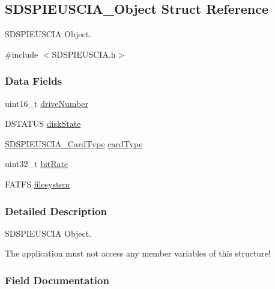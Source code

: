 \subsection{S\+D\+S\+P\+I\+E\+U\+S\+C\+I\+A\+\_\+\+Object Struct Reference}
\label{struct_s_d_s_p_i_e_u_s_c_i_a___object}


S\+D\+S\+P\+I\+E\+U\+S\+C\+I\+A Object.  




{\ttfamily \#include $<$S\+D\+S\+P\+I\+E\+U\+S\+C\+I\+A.\+h$>$}

\subsubsection*{Data Fields}
\begin{DoxyCompactItemize}
\item 
uint16\+\_\+t \hyperlink{struct_s_d_s_p_i_e_u_s_c_i_a___object_a5d6a52c5b2b7a1dda7fe2279f19c5e6b}{drive\+Number}
\item 
D\+S\+T\+A\+T\+U\+S \hyperlink{struct_s_d_s_p_i_e_u_s_c_i_a___object_adcb732d472748393dbf3a52e24b4d428}{disk\+State}
\item 
\hyperlink{_s_d_s_p_i_e_u_s_c_i_a_8h_aaf384a8a07d5fb92b9ba72250174d577}{S\+D\+S\+P\+I\+E\+U\+S\+C\+I\+A\+\_\+\+Card\+Type} \hyperlink{struct_s_d_s_p_i_e_u_s_c_i_a___object_a50815c1e112047b907a4f9d84b872727}{card\+Type}
\item 
uint32\+\_\+t \hyperlink{struct_s_d_s_p_i_e_u_s_c_i_a___object_a83aec3fd0962a754e277c9fc21f97549}{bit\+Rate}
\item 
F\+A\+T\+F\+S \hyperlink{struct_s_d_s_p_i_e_u_s_c_i_a___object_a3e10853e7c79a7b99d481353cbd71739}{filesystem}
\end{DoxyCompactItemize}


\subsubsection{Detailed Description}
S\+D\+S\+P\+I\+E\+U\+S\+C\+I\+A Object. 

The application must not access any member variables of this structure! 

\subsubsection{Field Documentation}
